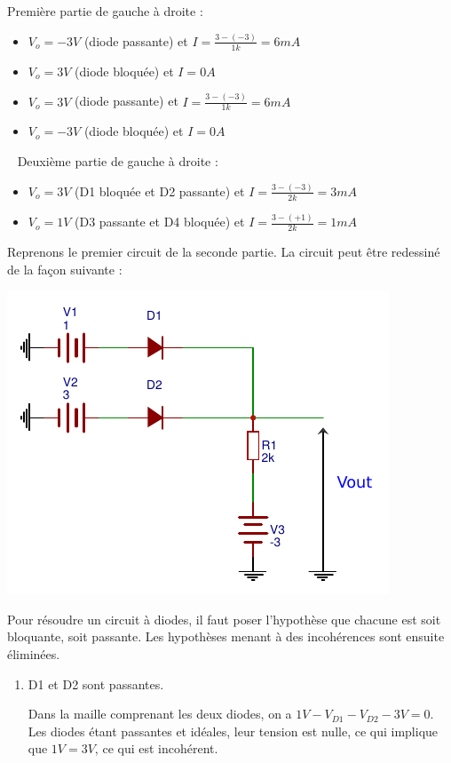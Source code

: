 \documentclass{../template/tp}
\begin{document}
{%
Première partie de gauche à droite :
\begin{itemize}
    \item $V_o = -3V$ (diode passante) et $I = \frac{3-(-3)}{1k}=6mA$
    \item $V_o = 3V$ (diode bloquée) et $I=0A$
    \item $V_o = 3V$ (diode passante) et $I= \frac{3-(-3)}{1k}=6mA$
    \item $V_o = -3V$ (diode bloquée) et $I = 0A$
\end{itemize}
~\newline
Deuxième partie de gauche à droite :
\begin{itemize}
    \item $V_o = 3V$ (D1 bloquée et D2 passante) et $I = \frac{3-(-3)}{2k} = 3mA$
    \item $V_o = 1V$ (D3 passante et D4 bloquée) et $I = \frac{3-(+1)}{2k} = 1mA$
\end{itemize}

Reprenons le premier circuit de la seconde partie.
La circuit peut être redessiné de la façon suivante :
\begin{center}
    \includegraphics[scale=1.4]{ex3-corrige}
\end{center}

Pour résoudre un circuit à diodes, il faut poser l'hypothèse que chacune est soit bloquante, soit passante.
Les hypothèses menant à des incohérences sont ensuite éliminées.

\begin{enumerate}
    \item D1 et D2 sont passantes.

    Dans la maille comprenant les deux diodes, on a $1V - V_{D1} -V_{D2} - 3V = 0$.
    Les diodes étant passantes et idéales, leur tension est nulle, ce qui implique que $1V = 3V$, ce qui est incohérent.


\end{enumerate}}
\end{document}
